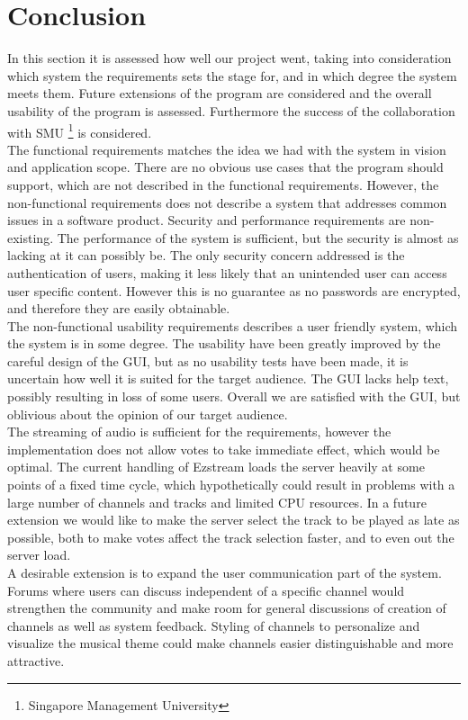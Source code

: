 \documentclass[a4paper,11pt,report]{article}
\begin{document}
\section{Conclusion}
In this section it is assessed how well our project went, taking into consideration which system the requirements sets the stage for, and in which degree the system meets them. Future extensions of the program are considered and the overall usability of the program is assessed. Furthermore the success of the collaboration with SMU \footnote{Singapore Management University} is considered. \\
The functional requirements matches the idea we had with the system in vision and application scope. There are no obvious use cases that the program should support, which are not described in the functional requirements. However, the non-functional requirements does not describe a system that addresses common issues in a software product. Security and performance requirements are non-existing. The performance of the system is sufficient, but the security is almost as lacking at it can possibly be. The only security concern addressed is the authentication of users, making it less likely that an unintended user can access user specific content. However this is no guarantee as no passwords are encrypted, and therefore they are easily obtainable. \\
The non-functional usability requirements describes a user friendly system, which the system is in some degree. The usability have been greatly improved by the careful design of the GUI, but as no usability tests have been made, it is uncertain how well it is suited for the target audience. The GUI lacks help text, possibly resulting in loss of some users. Overall we are satisfied with the GUI, but oblivious about the opinion of our target audience. \\
The streaming of audio is sufficient for the requirements, however the implementation does not allow votes to take immediate effect, which would be optimal. The current handling of Ezstream loads the server heavily at some points of a fixed time cycle, which hypothetically could result in problems with a large number of channels and tracks and limited CPU resources. In a future extension we would like to make the server select the track to be played as late as possible, both to make votes affect the track selection faster, and to even out the server load. \\
A desirable extension is to expand the user communication part of the system. Forums where users can discuss independent of a specific channel would strengthen the community and make room for general discussions of creation of channels as well as system feedback. Styling of channels to personalize and visualize the musical theme could make channels easier distinguishable and more attractive. \\
\end{document}
